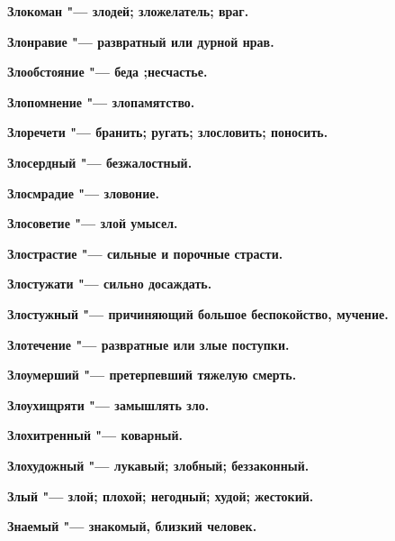 \begin{mymulticols}{2}
\bfseries Злокоман\normalfont{} "--- злодей; зложелатель; враг. 




\bfseries Злонравие\normalfont{} "--- развратный или дурной нрав. 




\bfseries Злообстояние\normalfont{} "--- беда ;несчастье. 




\bfseries Злопомнение\normalfont{} "--- злопамятство. 




\bfseries Злоречети\normalfont{} "--- бранить; ругать; злословить; поносить. 




\bfseries Злосердный\normalfont{} "--- безжалостный. 




\bfseries Злосмрадие\normalfont{} "--- зловоние. 




\bfseries Злосоветие\normalfont{} "--- злой умысел. 




\bfseries Злострастие\normalfont{} "--- сильные и порочные страсти. 




\bfseries Злостужати\normalfont{} "--- сильно досаждать. 




\bfseries Злостужный\normalfont{} "--- причиняющий большое беспокойство, мучение. 




\bfseries Злотечение\normalfont{} "--- развратные или злые поступки. 




\bfseries Злоумерший\normalfont{} "--- претерпевший тяжелую смерть. 




\bfseries Злоухищряти\normalfont{} "--- замышлять зло. 




\bfseries Злохитренный\normalfont{} "--- коварный. 




\bfseries Злохудожный\normalfont{} "--- лукавый; злобный; беззаконный. 




\bfseries Злый\normalfont{} "--- злой; плохой; негодный; худой; жестокий. 




\bfseries Знаемый\normalfont{} "--- знакомый, близкий человек. 





\end{mymulticols}
